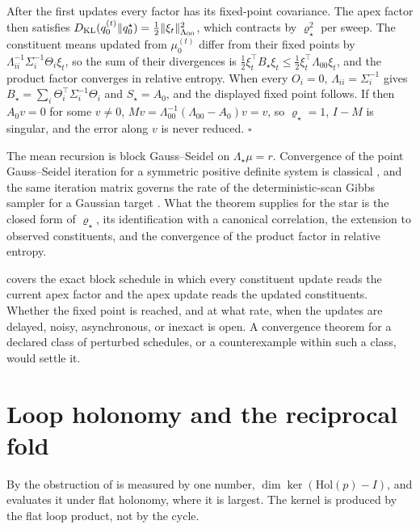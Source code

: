 After the first updates every factor has its fixed-point covariance. The apex factor then
satisfies \(D_{\mathrm{KL}}(q_0^{(t)}\Vert q_0^\star)=\tfrac12\lVert\xi_t\rVert_{\Lambda_{00}}^2\), which
contracts by \(\varrho_\star^2\) per sweep. The constituent means updated from
\(\mu_0^{(t)}\) differ from their fixed points by \(\Lambda_{ii}^{-1}\Sigma_i^{-1}\Theta_i\xi_t\),
so the sum of their divergences is \(\tfrac12\xi_t^\top B_\star\xi_t\leq\tfrac12\xi_t^\top\Lambda_{00}\xi_t\),
and the product factor converges in relative entropy. When every \(O_i=0\),
\(\Lambda_{ii}=\Sigma_i^{-1}\) gives \(B_\star=\sum_i\Theta_i^\top\Sigma_i^{-1}\Theta_i\) and
\(S_\star=A_0\), and the displayed fixed point follows. If then \(A_0v=0\) for some
\(v\neq0\), \(Mv=\Lambda_{00}^{-1}(\Lambda_{00}-A_0)v=v\), so \(\varrho_\star=1\), \(I-M\) is singular,
and the error along \(v\) is never reduced. \hfill$\square$

\medskip
The mean recursion is block Gauss--Seidel on \(\Lambda_\star\mu=r\). Convergence of the point
Gauss--Seidel iteration for a symmetric positive definite system is classical
\citep[Thm.~11.2.3]{GolubVanLoan2013}, and the same iteration matrix governs the rate of the
deterministic-scan Gibbs sampler for a Gaussian target \citep{RobertsSahu1997}. What the
theorem supplies for the star is the closed form of \(\varrho_\star\), its identification
with a canonical correlation, the extension to observed constituents, and the convergence
of the product factor in relative entropy.

 covers the exact block schedule in which every
constituent update reads the current apex factor and the apex update reads the updated
constituents. Whether the fixed point is reached, and at what rate, when the updates are
delayed, noisy, asynchronous, or inexact is open. A convergence theorem for a declared
class of perturbed schedules, or a counterexample within such a class, would settle it.

\section{Loop holonomy and the reciprocal fold}
\label{sec:obs-flatness}

By  the obstruction of  is
measured by one number, \(\dim\ker(\mathrm{Hol}(p)-I)\), and
 evaluates it under flat holonomy, where it is largest.
The kernel is produced by the flat loop product, not by the cycle.


